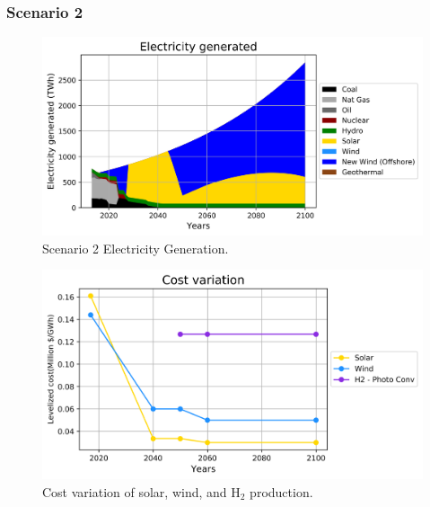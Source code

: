 \begin{frame}
  \frametitle{Scenario 2}
  \begin{figure}[htbp!]
    \begin{center}
      \includegraphics[scale=0.6]{./images/conv_nonuc_elc}
    \end{center}
          \caption{Scenario 2 Electricity Generation.}
    \label{s2e}
  \end{figure}
\end{frame}

\begin{frame}
  \begin{figure}[htbp!]
    \begin{center}
      \includegraphics[scale=0.6]{./images/cost}
    \end{center}
          \caption{Cost variation of solar, wind, and H$_2$ production.}
    \label{cost}
  \end{figure}

\end{frame}

